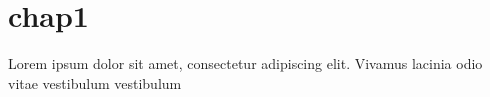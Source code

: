 \section{chap1}
Lorem ipsum dolor sit amet, consectetur adipiscing elit. Vivamus lacinia odio vitae vestibulum vestibulum